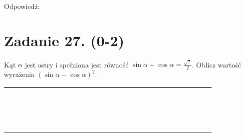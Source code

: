\documentclass[10pt]{article}
\begin{document}
Odpowiedź:

\section*{Zadanie 27. (0-2)}
Kąt \(\alpha\) jest ostry i spełniona jest równość \(\sin \alpha+\cos \alpha=\frac{\sqrt{7}}{2}\). Oblicz wartość wyrażenia \((\sin \alpha-\cos \alpha)^{2}\).

\begin{center}
\begin{tabular}{|c|c|c|c|c|c|c|c|c|c|c|c|c|c|c|c|c|c|c|c|c|c|c|c|c|c|}
\hline
 &  &  &  &  &  &  &  &  &  &  &  &  &  &  &  &  &  &  &  &  &  &  &  &  &  \\
\hline
 &  &  &  &  &  &  &  &  &  &  &  &  &  &  &  &  &  &  &  &  &  &  &  &  &  \\
\hline
 &  &  &  &  &  &  &  &  &  &  &  &  &  &  &  &  &  &  &  &  &  &  &  &  &  \\
\hline
 &  &  &  &  &  &  &  &  &  &  &  &  &  &  &  &  &  &  &  &  &  &  &  &  &  \\
\hline
 &  &  &  &  &  &  &  &  &  &  &  &  &  &  &  &  &  &  &  &  &  &  &  &  &  \\
\hline
 &  &  &  &  &  &  &  &  &  &  &  &  &  &  &  &  &  &  &  &  &  &  &  &  &  \\
\hline
 &  &  &  &  &  &  &  &  &  &  &  &  &  &  &  &  &  &  &  &  &  &  &  &  &  \\
\hline
 &  &  &  &  &  &  &  &  &  &  &  &  &  &  &  &  &  &  &  &  &  &  &  &  &  \\
\hline
 &  &  &  &  &  &  &  &  &  &  &  &  &  &  &  &  &  &  &  &  &  &  &  &  &  \\
\hline
 &  &  &  &  &  &  &  &  &  &  &  &  &  &  &  &  &  &  &  &  &  &  &  &  &  \\
\hline
 &  &  &  &  &  &  &  &  &  &  &  &  &  &  &  &  &  &  &  &  &  &  &  &  &  \\
\hline
 &  &  &  &  &  &  &  &  &  &  &  &  &  &  &  &  &  &  &  &  &  &  &  &  &  \\
\hline
 &  &  &  &  &  &  &  &  &  &  &  &  &  &  &  &  &  &  &  &  &  &  &  &  &  \\
\hline
 &  &  &  &  &  &  &  &  &  &  &  &  &  &  &  &  &  &  &  &  &  &  &  &  &  \\
\hline
 &  &  &  &  &  &  &  &  &  &  &  &  &  &  &  &  &  &  &  &  &  &  &  &  &  \\
\hline
 &  &  &  &  &  &  &  &  &  &  &  &  &  &  &  &  &  &  &  &  &  &  &  &  &  \\

\end{tabular}
\end{center}
\end{document}
